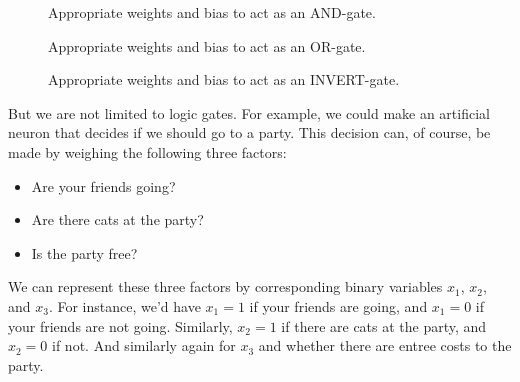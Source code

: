 \begin{figure}[h!]
\centering
{}
\caption{Appropriate weights and bias to act as an AND-gate.}
\label{fig:neuron_and_gate}
\end{figure}
\begin{figure}[h!]
\centering
{}
\caption{Appropriate weights and bias to act as an OR-gate.}
\label{fig:neuron_or_gate}
\end{figure}
\begin{figure}[h!]
\centering
{}
\caption{Appropriate weights and bias to act as an INVERT-gate.}
\label{fig:neuron_invert_gate}
\end{figure}

\noindent
But we are not limited to logic gates. For example, we could make an artificial neuron that decides if we should go to a party. This decision can, of course, be made by weighing the following three factors:
\begin{itemize}
    \item Are your friends going?
    \item Are there cats at the party?
    \item Is the party free?
\end{itemize}
We can represent these three factors by corresponding binary variables $x_1$, $x_2$, and $x_3$. For instance, we'd have $x_1 = 1$ if your friends are going, and $x_1 = 0$ if your friends are not going. Similarly, $x_2=1$ if there are cats at the party, and $x_2=0$ if not. And similarly again for $x_3$ and whether there are entree costs to the party.

